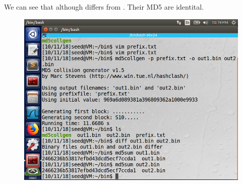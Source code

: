 \documentclass{article}
\begin{document}
We can see that although  differs from . Their MD5 are identital.
\begin{figure}[H]\centering\includegraphics[width=\textwidth]{ss/03.png}\end{figure}
\end{document}
